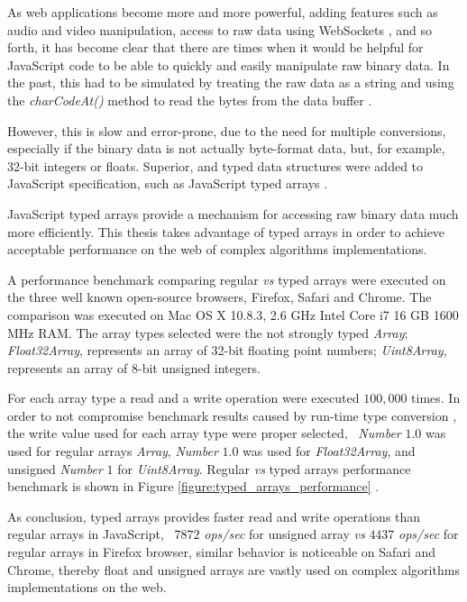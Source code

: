 As web applications become more and more powerful, adding features such as audio and video manipulation, access to raw data using WebSockets \cite{MDN2013}, and so forth, it has become clear that there are times when it would be helpful for JavaScript code to be able to quickly and easily manipulate raw binary data. In the past, this had to be simulated by treating the raw data as a string and using the \textit{charCodeAt()} method to read the bytes from the data buffer \cite{MDN2013} \cite{TypedArray2013}.

However, this is slow and error-prone, due to the need for multiple conversions, especially if the binary data is not actually byte-format data, but, for example, 32-bit integers or floats. Superior, and typed data structures were added to JavaScript specification, such as JavaScript typed arrays \cite{International2009}.

JavaScript typed arrays provide a mechanism for accessing raw binary data much more efficiently. This thesis takes advantage of typed arrays in order to achieve acceptable performance on the web of complex algorithms implementations.

A performance benchmark comparing regular \textit{vs} typed arrays were executed on the three well known open-source browsers, Firefox, Safari and Chrome. The comparison was executed on Mac OS X 10.8.3, 2.6 GHz Intel Core i7 16 GB 1600 MHz RAM. The array types selected were the not strongly typed \textit{Array}; \textit{Float32Array}, represents an array of 32-bit floating point numbers; \textit{Uint8Array}, represents an array of 8-bit unsigned integers.

For each array type a read and a write operation were executed $100,000$ times. In order to not compromise benchmark results caused by run-time type conversion \cite{International2009}, the write value used for each array type were proper selected, \eg\ \textit{Number} $1.0$ was used for regular arrays \textit{Array}, \textit{Number} $1.0$ was used for \textit{Float32Array}, and unsigned \textit{Number} $1$ for \textit{Uint8Array}. Regular \textit{vs} typed arrays performance benchmark is shown in Figure \ref{figure:typed_arrays_performance} \cite{TypedArrayPerformance2013}.

As conclusion, typed arrays provides faster read and write operations than regular arrays in JavaScript, \ie\ $7872$ \textit{ops/sec} for unsigned array \textit{vs} $4437$ \textit{ops/sec} for regular arrays in Firefox browser, similar behavior is noticeable on Safari and Chrome, thereby float and unsigned arrays are vastly used on complex algorithms implementations on the web.

